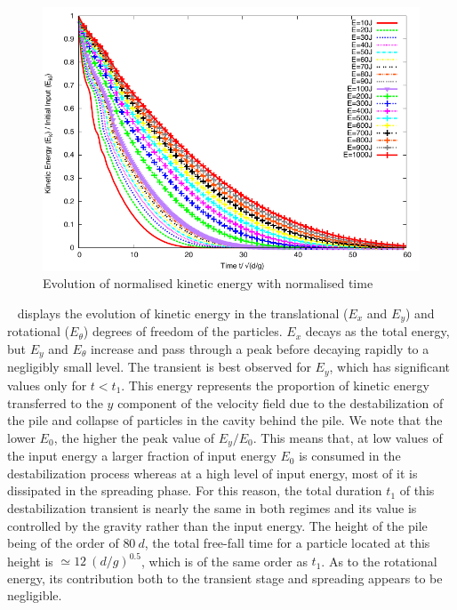 \begin{figure}[tbhp]
\centering
\includegraphics[width=\textwidth]{Normalised_Energy_Time_Slope}
\caption{Evolution of normalised kinetic energy with normalised time}
\label{fig:Normalised_Energy_Time_Slope}
\end{figure}

~ displays the evolution of kinetic energy 
in the translational ($E_x$ and $E_y$) and rotational ($E_\theta$) 
degrees of freedom of the particles. $E_x$ decays as the total 
energy, but $E_y$ and $E_\theta$ increase and pass through a peak before 
decaying rapidly to a negligibly small level. The transient is best observed 
for $E_y$, which has significant values only for $t< t_1$. This energy 
represents the proportion of kinetic energy transferred to the $y$ component of 
the velocity field  due to the destabilization of the pile and collapse of 
particles in the cavity behind the pile. We note that the lower $E_0$, the 
higher the peak value of $E_y/E_0$. 
This means that, at low values of the input energy a larger fraction 
of input energy $E_0$ is consumed in the destabilization process whereas 
at a high level of input energy, most of it is dissipated in the spreading 
phase. For this reason, the total duration $t_1$ of this destabilization 
transient is nearly the same in both regimes and its value is controlled by the 
gravity rather than the input energy. The height of the pile being of the order 
of $80 \ d$, the total free-fall time for a particle located at this height is 
$\simeq 12 \ (d/g)^{0.5}$, which is of the same order as $t_1$. As to the 
rotational energy, its contribution both to the transient stage and spreading 
appears to be negligible. 

